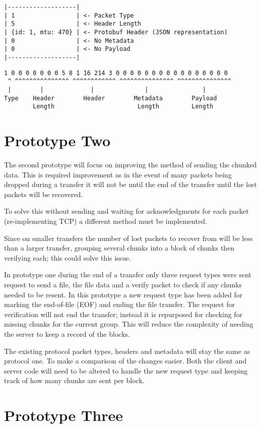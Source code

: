 \begin{lstlisting}[float,caption={Prototype One Example Packet Structure},label=p1d-example-structure]
|-------------------|
| 1                 | <- Packet Type
| 5                 | <- Header Length
| {id: 1, mtu: 470} | <- Protobuf Header (JSON representation)
| 0                 | <- No Metadata
| 0                 | <- No Payload
|-------------------|
\end{lstlisting}

\begin{lstlisting}[float,caption={Prototype One Example Packet Binary},label=p1d-example-binary]
 1 0 0 0 0 0 0 0 5 8 1 16 214 3 0 0 0 0 0 0 0 0 0 0 0 0 0 0 0 0
 ^ ^^^^^^^^^^^^^^^ ^^^^^^^^^^^^ ^^^^^^^^^^^^^^^ ^^^^^^^^^^^^^^^
 |        |             |              |               |
Type    Header        Header        Metadata        Payload
        Length                       Length         Length
\end{lstlisting}

\FloatBarrier


\section{Prototype Two}
The second prototype will focus on improving the method of sending the chunked data. This is required improvement as in the event of many packets being dropped during a transfer it will not be until the end of the transfer until the lost packets will be recovered.

To solve this without sending and waiting for acknowledgments for each packet (re-implementing TCP) a different method must be implemented.

Since on smaller transfers the number of lost packets to recover from will be less than a larger transfer, grouping several chunks into a block of chunks then verifying each; this could solve this issue.

In prototype one during the end of a transfer only three request types were sent request to send a file, the file data and a verify packet to check if any chunks needed to be resent. In this prototype a new request type has been added for marking the end-of-file (EOF) and ending the file transfer. The request for verification will not end the transfer; instead it is repurposed for checking for missing chunks for the current group. This will reduce the complexity of needing the server to keep a record of the blocks.

The existing protocol packet types, headers and metadata will stay the same as protocol one. To make a comparison of the changes easier. Both the client and server code will need to be altered to handle the new request type and keeping track of how many chunks are sent per block.


\section{Prototype Three}
